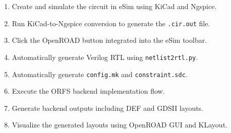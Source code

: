 \begin{enumerate}
    \item Create and simulate the circuit in eSim using KiCad and Ngspice.
    
    \item Run KiCad-to-Ngspice conversion to generate the \texttt{.cir.out} file.
    
    \item Click the OpenROAD button integrated into the eSim toolbar.
    
    \item Automatically generate Verilog RTL using \texttt{netlist2rtl.py}.
    
    \item Automatically generate \texttt{config.mk} and \texttt{constraint.sdc}.
    
    \item Execute the ORFS backend implementation flow.
    
    \item Generate backend outputs including DEF and GDSII layouts.
    
    \item Visualize the generated layouts using OpenROAD GUI and KLayout.
\end{enumerate}